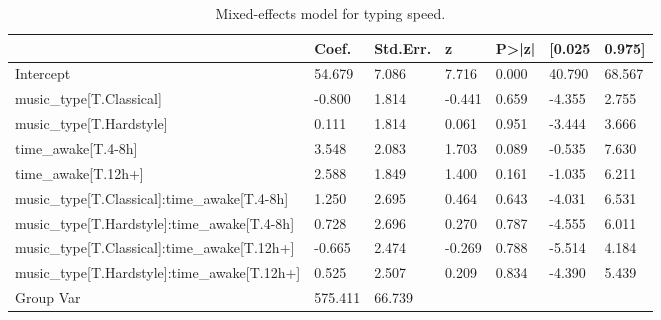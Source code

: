 
        \begin{table}[htbp]
            \centering
            \caption{Mixed-effects model for typing speed.}
            \label{tab:wpm}
            \footnotesize
            \begin{tabular}{lllllll}
\toprule
 & Coef. & Std.Err. & z & P>|z| & [0.025 & 0.975] \\
\midrule
Intercept & 54.679 & 7.086 & 7.716 & 0.000 & 40.790 & 68.567 \\
music_type[T.Classical] & -0.800 & 1.814 & -0.441 & 0.659 & -4.355 & 2.755 \\
music_type[T.Hardstyle] & 0.111 & 1.814 & 0.061 & 0.951 & -3.444 & 3.666 \\
time_awake[T.4-8h] & 3.548 & 2.083 & 1.703 & 0.089 & -0.535 & 7.630 \\
time_awake[T.12h+] & 2.588 & 1.849 & 1.400 & 0.161 & -1.035 & 6.211 \\
music_type[T.Classical]:time_awake[T.4-8h] & 1.250 & 2.695 & 0.464 & 0.643 & -4.031 & 6.531 \\
music_type[T.Hardstyle]:time_awake[T.4-8h] & 0.728 & 2.696 & 0.270 & 0.787 & -4.555 & 6.011 \\
music_type[T.Classical]:time_awake[T.12h+] & -0.665 & 2.474 & -0.269 & 0.788 & -5.514 & 4.184 \\
music_type[T.Hardstyle]:time_awake[T.12h+] & 0.525 & 2.507 & 0.209 & 0.834 & -4.390 & 5.439 \\
Group Var & 575.411 & 66.739 &  &  &  &  \\
\bottomrule
\end{tabular}

        \end{table}
